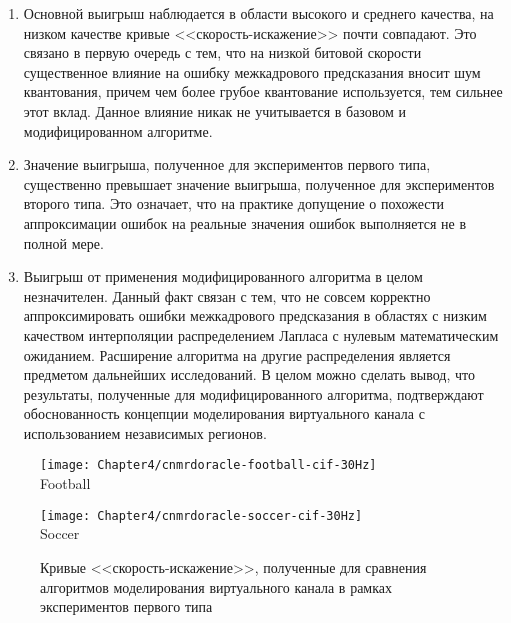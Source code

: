 \begin{enumerate}
    \item Основной выигрыш наблюдается в области высокого и среднего качества, на низком качестве кривые <<скорость-искажение>> почти совпадают. Это связано в первую очередь с тем, что на низкой битовой скорости существенное влияние на ошибку межкадрового предсказания вносит шум квантования, причем чем более грубое квантование используется, тем сильнее этот вклад. Данное влияние никак не учитывается в базовом и модифицированном алгоритме.
    \item Значение выигрыша, полученное для экспериментов первого типа, существенно превышает значение выигрыша, полученное для экспериментов второго типа. Это означает, что на практике допущение о похожести аппроксимации ошибок на реальные значения ошибок выполняется не в полной мере.
    \item Выигрыш от применения модифицированного алгоритма в целом незначителен. Данный факт связан с тем, что не совсем корректно аппроксимировать ошибки межкадрового предсказания в областях с низким качеством интерполяции распределением Лапласа с нулевым математическим ожиданием. Расширение алгоритма на другие распределения является предметом дальнейших исследований. В целом можно сделать вывод, что результаты, полученные для модифицированного алгоритма, подтверждают обоснованность концепции моделирования виртуального канала с использованием независимых регионов.
\end{enumerate}

\begin{figure}[htbp]
    \begin{center}
        \begin{minipage}{0.45\textwidth}
            \centering\texttt{[image: Chapter4/cnmrdoracle-football-cif-30Hz]} \\ Football
        \end{minipage}
        \begin{minipage}{0.45\textwidth}
            \centering\texttt{[image: Chapter4/cnmrdoracle-soccer-cif-30Hz]} \\ Soccer
        \end{minipage}
    \end{center}
    \caption{Кривые <<скорость-искажение>>, полученные для сравнения алгоритмов моделирования виртуального канала в рамках экспериментов первого типа}
    \label{fig:CNM3}
\end{figure}

